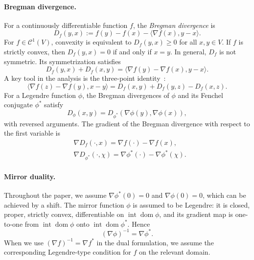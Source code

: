 \documentclass{article}
\theoremstyle{plain}
\theoremstyle{definition}
\theoremstyle{remark}
\begin{document}
\paragraph{Bregman divergence.}
For a continuously differentiable function $f$, the {\it Bregman divergence} is
\begin{equation*}
D_f(y,x):=f(y)-f(x)-\langle \nabla f(x),y-x\rangle.
\end{equation*}
For $f\in \mathcal C^1(V)$, convexity is equivalent to $D_f(y,x)\ge 0$ for all $x,y\in V$. If $f$ is strictly convex, then $D_f(y,x)=0$ if and only if $x=y$. In general, $D_f$ is not symmetric. Its symmetrization satisfies
$$
D_f(y,x)+D_f(x,y)=\langle \nabla f(y)-\nabla f(x),y-x\rangle.
$$
A key tool in the analysis is the three-point identity~\cite{chen1993convergence}:
\begin{equation}\label{eq:Bregmanidentity}
\langle \nabla f(z)-\nabla f(y),x-y\rangle
=
D_f(x,y)+D_f(y,z)-D_f(x,z).
\end{equation}
For a Legendre function $\phi$, the Bregman divergences of $\phi$ and its Fenchel conjugate $\phi^*$ satisfy
\begin{equation}\label{eq:DfDf*}
D_\phi(x,y)=D_{\phi^*}(\nabla\phi(y),\nabla\phi(x)),
\end{equation}
with reversed arguments. The gradient of the Bregman divergence with respect to the first variable is
\begin{equation}\label{eq:gradD}
\begin{aligned}
&\nabla D_f(\cdot,x)=\nabla f(\cdot)-\nabla f(x),\\
&\nabla D_{\phi^*}(\cdot,\chi)=\nabla\phi^*(\cdot)-\nabla\phi^*(\chi).
\end{aligned}
\end{equation}

\paragraph{Mirror duality.}
Throughout the paper, we assume $\nabla\phi^*(0)=0$ and $\nabla\phi(0)=0$, which can be achieved by a shift. The mirror function $\phi$ is assumed to be Legendre: it is closed, proper, strictly convex, differentiable on $\operatorname{int}\operatorname{dom}\phi$, and its gradient map is one-to-one from $\operatorname{int}\operatorname{dom}\phi$ onto $\operatorname{int}\operatorname{dom}\phi^*$. Hence
$$
(\nabla\phi)^{-1}=\nabla\phi^*.
$$
When we use $(\nabla f)^{-1}=\nabla f^*$ in the dual formulation, we assume the corresponding Legendre-type condition for $f$ on the relevant domain.
\end{document}
